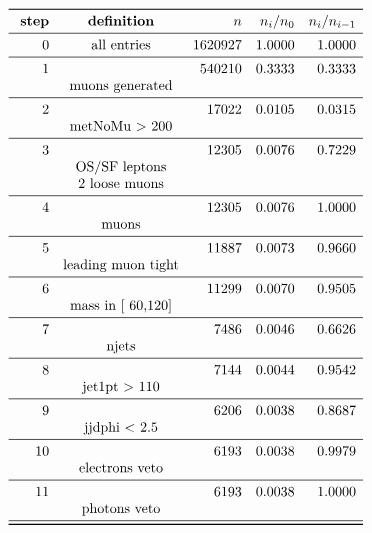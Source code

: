 \documentclass[11pt,a4paper]{article}
\begin{document}
\begin{table}
\caption{\emph{Entries after each selection step, normalised to 5.00 $fb^{-1}$; n is the number of entries after the i-th selection step; Note that cuts on second jet are applied only if a second jet exists with $p_t$ > 30\,GeV.}}
\[
\begin{array}{rcrrr}
\toprule
\ \textbf{step}& \textbf{definition}  & n  &  n_i/n_0 & n_i/n_{i-1}  \\ 
\midrule
 0  & \text{all entries} & 1620927 & 1.0000 & 1.0000 \\
\midrule
 1  & & 540210 & 0.3333 & 0.3333 \\
& \text{muons generated} & & & \\
\midrule
 2  & &  17022 & 0.0105 & 0.0315 \\
& \text{metNoMu > 200} & & & \\
\midrule
 3  & &  12305 & 0.0076 & 0.7229 \\
& \text{OS/SF leptons} & & & \\
& \text{2 loose muons} & & & \\
\midrule
 4  & &  12305 & 0.0076 & 1.0000 \\
& \text{muons} & & & \\
\midrule
 5  & &  11887 & 0.0073 & 0.9660 \\
& \text{leading muon tight} & & & \\
\midrule
 6  & &  11299 & 0.0070 & 0.9505 \\
& \text{mass in [ 60,120]} & & & \\
\midrule
 7  & &   7486 & 0.0046 & 0.6626 \\
& \text{njets} & & & \\
\midrule
 8  & &   7144 & 0.0044 & 0.9542 \\
& \text{jet1pt >  110} & & & \\
\midrule
 9  & &   6206 & 0.0038 & 0.8687 \\
& \text{jjdphi < 2.5} & & & \\
\midrule
 10  & &   6193 & 0.0038 & 0.9979 \\
& \text{electrons veto} & & & \\
\midrule
 11  & &   6193 & 0.0038 & 1.0000 \\
& \text{photons veto} & & & \\
\midrule
\bottomrule
\end{array}
\]
\end{table}
\end{document}
